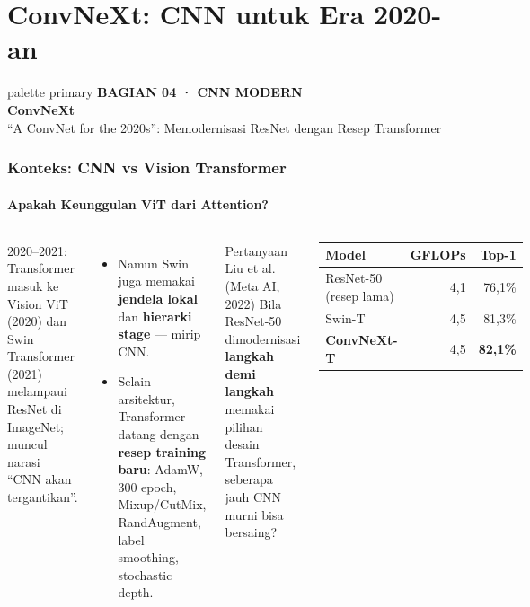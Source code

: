 \documentclass[t,aspectratio=169,xcolor=dvipsnames]{beamer}
\newcommand{\bagian}[3]{%
\begin{frame}[plain]
  \begin{beamercolorbox}[wd=\paperwidth,ht=\paperheight,sep=1.5cm]{palette primary}
    \vspace{1.5cm}
    {\scriptsize\bfseries\color{dlMute}#1}\\[0.4cm]
    {\Huge\bfseries #2}\\[0.4cm]
    {\small\color{dlHairline}#3}
    \vfill
  \end{beamercolorbox}
\end{frame}}
\begin{document}
\section{ConvNeXt: CNN untuk Era 2020-an}
\bagian{BAGIAN 04 · CNN MODERN}{ConvNeXt}{``A ConvNet for the 2020s'': Memodernisasi ResNet dengan Resep Transformer}

\begin{frame}
    \frametitle{Konteks: CNN vs Vision Transformer}
    \framesubtitle{Apakah Keunggulan ViT dari Attention?}
    \footnotesize

    \begin{columns}[T]
        \begin{alertblock}{2020--2021: Transformer masuk ke Vision}
            ViT (2020) dan Swin Transformer (2021) melampaui ResNet di ImageNet; muncul narasi ``CNN akan tergantikan''.
        \end{alertblock}
        \begin{itemize}
            \item Namun Swin juga memakai \textbf{jendela lokal} dan \textbf{hierarki stage} --- mirip CNN.
            \item Selain arsitektur, Transformer datang dengan \textbf{resep training baru}: AdamW, 300 epoch, Mixup/CutMix, RandAugment, label smoothing, stochastic depth.
        \end{itemize}

        \begin{exampleblock}{Pertanyaan Liu et al. (Meta AI, 2022)}
            Bila ResNet-50 dimodernisasi \textbf{langkah demi langkah} memakai pilihan desain Transformer, seberapa jauh CNN murni bisa bersaing?
        \end{exampleblock}
        \vspace{2pt}
        \begin{center}
        \begin{tabular}{lrr}
            \toprule
            \textbf{Model} & \textbf{GFLOPs} & \textbf{Top-1} \\
            \midrule
            ResNet-50 (resep lama) & 4,1 & 76,1\% \\
            Swin-T & 4,5 & 81,3\% \\
            \textbf{ConvNeXt-T} & 4,5 & \textbf{82,1\%} \\
            \bottomrule
        \end{tabular}
        \end{center}
    \end{columns}
\end{frame}
\end{document}
